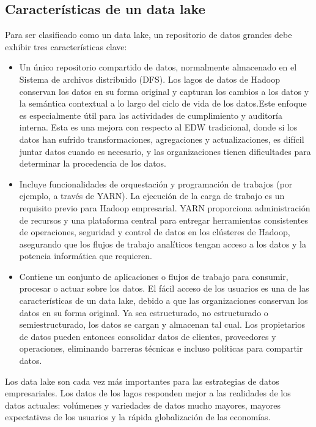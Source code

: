 \documentclass[preprint,12pt]{elsarticle}
\begin{document}
\subsection{Características de un data lake}	
Para ser clasificado como un data lake, un repositorio de datos grandes debe exhibir tres características clave:

\begin{itemize}

\item Un único repositorio compartido de datos, normalmente almacenado en el Sistema de archivos distribuido (DFS). Los lagos de datos de Hadoop conservan los datos en su forma original y capturan los cambios a los datos y la semántica contextual a lo largo del ciclo de vida de los datos.Este enfoque es especialmente útil para las actividades de cumplimiento y auditoría interna.
Esta es una mejora con respecto al EDW tradicional, donde si los datos han sufrido transformaciones, agregaciones y actualizaciones, es difícil juntar datos cuando es necesario, y las organizaciones tienen dificultades para determinar la procedencia de los datos.
\item Incluye funcionalidades de orquestación y programación de trabajos (por ejemplo, a través de YARN). La ejecución de la carga de trabajo es un requisito previo para Hadoop empresarial.
YARN proporciona administración de recursos y una plataforma central para entregar herramientas consistentes de operaciones, seguridad y control de datos en los clústeres de Hadoop, asegurando que los flujos de trabajo analíticos tengan acceso a los datos y la potencia informática que requieren.
\item Contiene un conjunto de aplicaciones o flujos de trabajo para consumir, procesar o actuar sobre los datos.
El fácil acceso de los usuarios es una de las características de un data lake, debido a que las organizaciones conservan los datos en su forma original. Ya sea estructurado, no estructurado o semiestructurado, los datos se cargan y almacenan tal cual. Los propietarios de datos pueden entonces consolidar datos de clientes, proveedores y operaciones, eliminando barreras técnicas e incluso políticas para compartir datos.
\end{itemize}
Los data lake son cada vez más importantes para las estrategias de datos empresariales. Los datos de los lagos responden mejor a las realidades de los datos actuales: volúmenes y variedades de datos mucho mayores, mayores expectativas de los usuarios y la rápida globalización de las economías.
\end{document}
